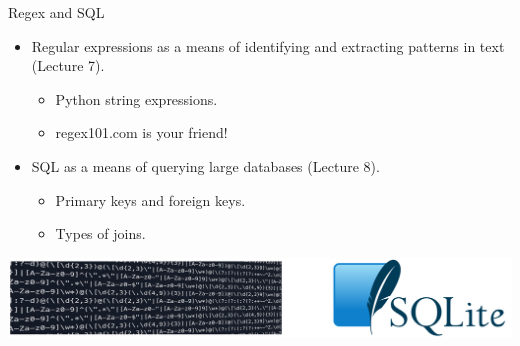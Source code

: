 \documentclass[aspectratio=169]{../latex_main/tntbeamer}  %
\begin{document}
	 
	 \begin{frame}{Regex and SQL}
	     \begin{itemize}
	         \item Regular expressions as a means of identifying and extracting patterns in text (Lecture 7).
	         \begin{itemize}
	             \item Python string expressions.
	             \item regex101.com is your friend!
	         \end{itemize}
	         \item SQL as a means of querying large databases (Lecture 8).
	         \begin{itemize}
	             \item Primary keys and foreign keys.
	             \item Types of joins.
	         \end{itemize}
	     \end{itemize}
	     \bigskip
	     \includegraphics[scale=.4]{Bild3}
	 \end{frame}
	 
	 
	 
\end{document}
